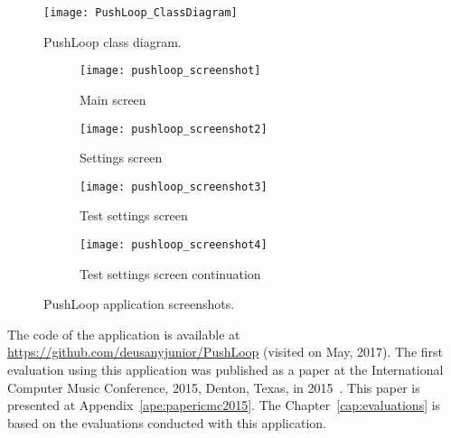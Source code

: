 \begin{figure}[!ht]
	\centering
	\texttt{[image: PushLoop\_ClassDiagram]}
	\caption{PushLoop class diagram.}
	\label{fig:pushloopclassdiagram}
\end{figure}

\begin{figure*}[!ht]
	\centering
	\begin{subfigure}{.20\textwidth}
		\texttt{[image: pushloop\_screenshot]}
		\caption{Main screen}
		\label{fig:pushloopss1}
	\end{subfigure}
	\begin{subfigure}{.20\textwidth}
		\texttt{[image: pushloop\_screenshot2]}
		\caption{Settings screen}
		\label{fig:pushloopss2}
	\end{subfigure}
	\begin{subfigure}{.20\textwidth}
		\texttt{[image: pushloop\_screenshot3]}
		\caption{Test settings screen}
		\label{fig:pushloopss3}
	\end{subfigure}
	\begin{subfigure}{.20\textwidth}
		\texttt{[image: pushloop\_screenshot4]}
		\caption{Test settings screen continuation}
		\label{fig:pushloopss4}
	\end{subfigure}
	
	\caption{PushLoop application screenshots.}
	\label{fig:pushloopscreenshots}
\end{figure*}

The code of the application is available at \url{https://github.com/deusanyjunior/PushLoop} (visited on May, 2017). 
The first evaluation using this application was published as a paper at the International Computer Music Conference, 2015, Denton, Texas, in 2015~\citep{deCarvalhoJunior2015computer}.
This paper is presented at Appendix~\ref{ape:papericmc2015}.
The Chapter~\ref{cap:evaluations} is based on the evaluations conducted with this application.


